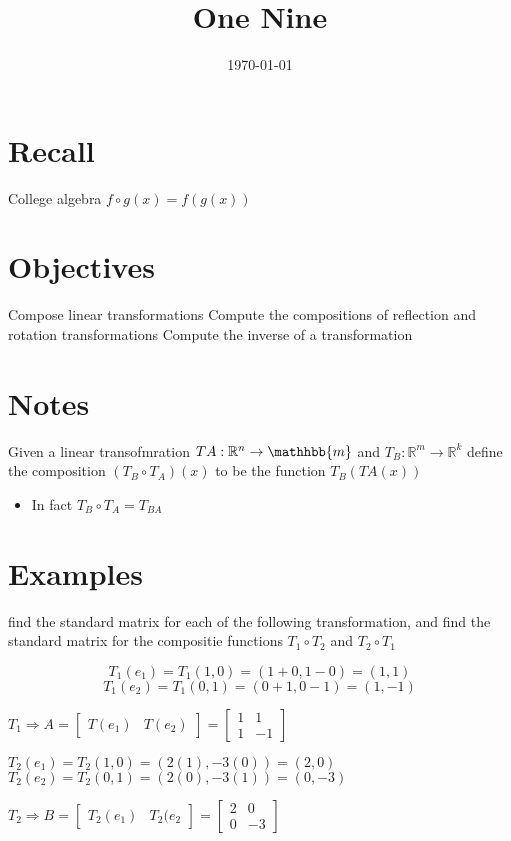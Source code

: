 \documentclass[11pt]{article}
\date{\today}
\title{One Nine}
\begin{document}
\maketitle
\tableofcontents

\section{Recall}
\label{sec:orgf90b711}
College algebra
\(f \circ{} g(x) = f(g(x))\)
\section{Objectives}
\label{sec:orgc3c7e9f}
Compose linear transformations
Compute the compositions of reflection and rotation transformations
Compute the inverse of a transformation
\section{Notes}
\label{sec:orgb683e36}
Given a linear transofmration \(T{A}: \mathbb{R}^{n} \rightarrow{} \mathhbb{m}\) and \(T_{B} : \mathbb{R}^{m} \rightarrow{} \mathbb{R}^{k}\)  define the composition \((T_{B}\circ{}T_{A})(x)\) to be the function \(T_{B}(T{A}(x))\)
\begin{itemize}
\item In fact \(T_{B}\circ{}T_{A} = T_{BA}\)
\end{itemize}
\section{Examples}
\label{sec:orgbfbb7d1}
find the standard matrix for each of the following transformation, and find the standard matrix for the compositie functions \(T_{1}\circ{}T_{2}\) and \(T_{2}\circ{}T_{1}\)

\[
T_{1}(e_{1}) = T_{1}(1,0) = (1+0,1-0) = (1,1)
\]
\[
T_{1}(e_{2}) = T_{1}(0,1) = (0+1,0-1) = (1,-1)
\]

\(T_{1} \Rightarrow{} A = \begin{bmatrix}T(e_{1})&T(e_{2})\end{bmatrix} = \begin{bmatrix}1&1\\1&-1\end{bmatrix}\)

\(T_{2}(e_1) = T_{2}(1,0) = (2(1), -3(0)) = (2,0)\)
\(T_{2}(e_2) = T_{2}(0,1) = (2(0), -3(1)) = (0, -3)\)

\(T_{2}\Rightarrow{}B=\begin{bmatrix}T_{2}(e_1)&T_{2}(e_{2}\end{bmatrix}=\begin{bmatrix}2&0\\0&-3\end{bmatrix}\)
\end{document}
